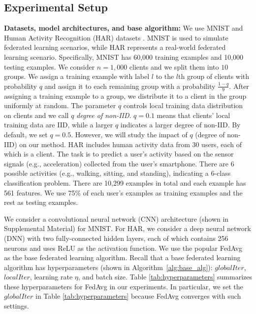 \documentclass[letterpaper]{article} %
\begin{document}
\subsection{Experimental Setup}

\noindent
{\bf Datasets, model architectures, and base algorithm:} We use MNIST \cite{lecun2010mnist} and Human Activity Recognition (HAR) datasets \cite{anguita2013public}.  MNIST is used to simulate federated learning scenarios, while  HAR represents a real-world federated learning scenario. Specifically, MNIST has 60,000 training examples and 10,000 testing examples. We consider $n=1,000$ clients and we split them into $10$ groups. We assign a training example with label $l$ to the $l$th group of clients with probability $q$ and assign it to each remaining group with a probability $\frac{1-q}{9}$. After assigning a training example to a group, we distribute it to a client in the group uniformly at random.
The parameter $q$ controls local training data distribution on clients and we call $q$ \emph{degree of non-IID}.  $q=0.1$ means that clients' local training data are IID, while a larger $q$ indicates a larger {degree of non-IID}. By default, we set $q=0.5$. However, we will study the impact of $q$ (degree of non-IID) on our method. HAR includes human activity data from 30 users, each of which is a client. The task is to predict a user's activity based on the sensor signals (e.g., acceleration) collected from the user's smartphone.  There are 6 possible activities (e.g., walking, sitting, and standing), indicating  a 6-class classification problem.  There are 10,299 examples in total and each example has 561 features. We use 75\% of each user's examples as training examples and the rest as testing examples.

We consider a convolutional neural network (CNN) architecture (shown in Supplemental Material) for MNIST. For HAR, we consider a deep neural network (DNN) with two fully-connected hidden layers, each of which contains 256 neurons and uses ReLU as the activation function. We use the popular FedAvg~\cite{mcmahan2016communication} as the base federated learning algorithm. Recall that a base federated learning algorithm has hyperparameters (shown in Algorithm~\ref{alg:base_alg}): $globalIter$, $localIter$,  learning rate $\eta$, and batch size. Table \ref{tab:hyperparameters} summarizes these hyperparameters for FedAvg in our experiments. In particular, we set the $globalIter$ in Table \ref{tab:hyperparameters} because FedAvg converges with such settings.
\end{document}
